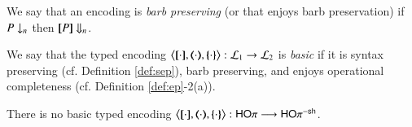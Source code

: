 We say that an encoding is \emph{barb preserving} (or that enjoys barb preservation)
if 
$P \downarrow_{n}$
then 
$[\!\![P]\!\!] \Downarrow_{n}$.

\begin{definition}\label{def:basenc}
We say that 
	the typed encoding 
	$\enco{\map{\cdot}, \mapt{\cdot}, \mapa{\cdot}}: \tyl{L}_1 \to \tyl{L}_2$ is 
	\emph{basic} 
	if it is syntax preserving 
	(cf. Definition \ref{def:sep}),
	barb preserving, and enjoys operational completeness (cf. Definition \ref{def:ep}-2(a)).
\end{definition}



\begin{theorem}%
	There is no basic typed encoding $\enco{\map{\cdot}, \mapt{\cdot}, \mapa{\cdot}}: \HOp \longrightarrow \HOp^{\minussh}$.
\end{theorem}

